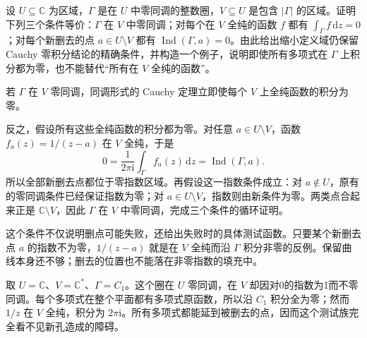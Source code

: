 \begin{exercise}\label{b3:ex:10-8}
设 \(U\subseteq\mathbb C\) 为区域，\(\Gamma\) 是在 \(U\) 中零同调的整数圈，\(V\subseteq U\) 是包含 \(|\Gamma|\) 的区域。证明下列三个条件等价：\(\Gamma\) 在 \(V\) 中零同调；对每个在 \(V\) 全纯的函数 \(f\) 都有 \(\int_\Gamma f\,\mathrm dz=0\)；对每个新删去的点 \(a\in U\setminus V\) 都有 \(\operatorname{Ind}(\Gamma,a)=0\)。由此给出缩小定义域仍保留 Cauchy 零积分结论的精确条件，并构造一个例子，说明即使所有多项式在 \(\Gamma\) 上积分都为零，也不能替代“所有在 \(V\) 全纯的函数”。
\end{exercise}
\begin{solution}
若 \(\Gamma\) 在 \(V\) 零同调，同调形式的 Cauchy 定理立即使每个 \(V\) 上全纯函数的积分为零。

反之，假设所有这些全纯函数的积分都为零。对任意 \(a\in U\setminus V\)，函数 \(f_a(z)=1/(z-a)\) 在 \(V\) 全纯，于是
\[
 0=\frac1{2\pi\mathrm i}\int_\Gamma f_a(z)\,\mathrm dz
  =\operatorname{Ind}(\Gamma,a).
\]
所以全部新删去点都位于零指数区域。再假设这一指数条件成立：对 \(a\notin U\)，原有的零同调条件已经保证指数为零；对 \(a\in U\setminus V\)，指数则由新条件为零。两类点合起来正是 \(\mathbb C\setminus V\)，因此 \(\Gamma\) 在 \(V\) 中零同调，完成三个条件的循环证明。

这个条件不仅说明删点可能失败，还给出失败时的具体测试函数。只要某个新删去点 \(a\) 的指数不为零，\(1/(z-a)\) 就是在 \(V\) 全纯而沿 \(\Gamma\) 积分非零的反例。保留曲线本身还不够；删去的位置也不能落在非零指数的填充中。

取 \(U=\mathbb C\)、\(V=\mathbb C^*\)、\(\Gamma=C_1\)。这个圈在 \(U\) 零同调，在 \(V\) 却因对0的指数为1而不零同调。每个多项式在整个平面都有多项式原函数，所以沿 \(C_1\) 积分全为零；然而 \(1/z\) 在 \(V\) 全纯，积分为 \(2\pi\mathrm i\)。所有多项式都能延到被删去的点，因而这个测试族完全看不见新孔造成的障碍。
\end{solution}
